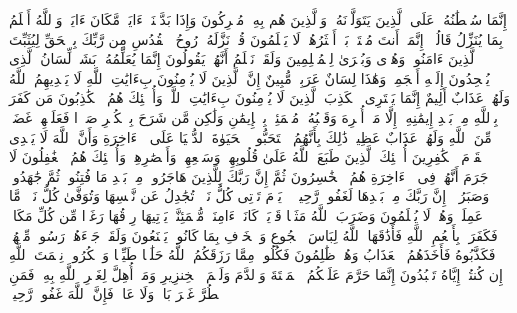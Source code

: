 \startbuffer[\q:16:100]
إِنَّمَا سُلۡطَٰنُهُۥ عَلَى ٱلَّذِینَ یَتَوَلَّوۡنَهُۥ وَٱلَّذِینَ هُم بِهِۦ مُشۡرِكُونَ%
\stopbuffer%
\startbuffer[\q:16:101]
وَإِذَا بَدَّلۡنَاۤ ءَایَةࣰ مَّكَانَ ءَایَةࣲ وَٱللَّهُ أَعۡلَمُ بِمَا یُنَزِّلُ قَالُوۤا۟ إِنَّمَاۤ أَنتَ مُفۡتَرِۭۚ بَلۡ أَكۡثَرُهُمۡ لَا یَعۡلَمُونَ%
\stopbuffer%
\startbuffer[\q:16:102]
قُلۡ نَزَّلَهُۥ رُوحُ ٱلۡقُدُسِ مِن رَّبِّكَ بِٱلۡحَقِّ لِیُثَبِّتَ ٱلَّذِینَ ءَامَنُوا۟ وَهُدࣰى وَبُشۡرَىٰ لِلۡمُسۡلِمِینَ%
\stopbuffer%
\startbuffer[\q:16:103]
وَلَقَدۡ نَعۡلَمُ أَنَّهُمۡ یَقُولُونَ إِنَّمَا یُعَلِّمُهُۥ بَشَرࣱۗ لِّسَانُ ٱلَّذِی یُلۡحِدُونَ إِلَیۡهِ أَعۡجَمِیࣱّ وَهَٰذَا لِسَانٌ عَرَبِیࣱّ مُّبِینٌ%
\stopbuffer%
\startbuffer[\q:16:104]
إِنَّ ٱلَّذِینَ لَا یُؤۡمِنُونَ بِءَایَٰتِ ٱللَّهِ لَا یَهۡدِیهِمُ ٱللَّهُ وَلَهُمۡ عَذَابٌ أَلِیمٌ%
\stopbuffer%
\startbuffer[\q:16:105]
إِنَّمَا یَفۡتَرِی ٱلۡكَذِبَ ٱلَّذِینَ لَا یُؤۡمِنُونَ بِءَایَٰتِ ٱللَّهِۖ وَأُو۟لَٰۤئِكَ هُمُ ٱلۡكَٰذِبُونَ%
\stopbuffer%
\startbuffer[\q:16:106]
مَن كَفَرَ بِٱللَّهِ مِنۢ بَعۡدِ إِیمَٰنِهِۦۤ إِلَّا مَنۡ أُكۡرِهَ وَقَلۡبُهُۥ مُطۡمَئِنُّۢ بِٱلۡإِیمَٰنِ وَلَٰكِن مَّن شَرَحَ بِٱلۡكُفۡرِ صَدۡرࣰا فَعَلَیۡهِمۡ غَضَبࣱ مِّنَ ٱللَّهِ وَلَهُمۡ عَذَابٌ عَظِیمࣱ%
\stopbuffer%
\startbuffer[\q:16:107]
ذَٰلِكَ بِأَنَّهُمُ ٱسۡتَحَبُّوا۟ ٱلۡحَیَوٰةَ ٱلدُّنۡیَا عَلَى ٱلۡءَاخِرَةِ وَأَنَّ ٱللَّهَ لَا یَهۡدِی ٱلۡقَوۡمَ ٱلۡكَٰفِرِینَ%
\stopbuffer%
\startbuffer[\q:16:108]
أُو۟لَٰۤئِكَ ٱلَّذِینَ طَبَعَ ٱللَّهُ عَلَىٰ قُلُوبِهِمۡ وَسَمۡعِهِمۡ وَأَبۡصَٰرِهِمۡۖ وَأُو۟لَٰۤئِكَ هُمُ ٱلۡغَٰفِلُونَ%
\stopbuffer%
\startbuffer[\q:16:109]
لَا جَرَمَ أَنَّهُمۡ فِی ٱلۡءَاخِرَةِ هُمُ ٱلۡخَٰسِرُونَ%
\stopbuffer%
\startbuffer[\q:16:110]
ثُمَّ إِنَّ رَبَّكَ لِلَّذِینَ هَاجَرُوا۟ مِنۢ بَعۡدِ مَا فُتِنُوا۟ ثُمَّ جَٰهَدُوا۟ وَصَبَرُوۤا۟ إِنَّ رَبَّكَ مِنۢ بَعۡدِهَا لَغَفُورࣱ رَّحِیمࣱ%
\stopbuffer%
\startbuffer[\q:16:111]
۞ یَوۡمَ تَأۡتِی كُلُّ نَفۡسࣲ تُجَٰدِلُ عَن نَّفۡسِهَا وَتُوَفَّىٰ كُلُّ نَفۡسࣲ مَّا عَمِلَتۡ وَهُمۡ لَا یُظۡلَمُونَ%
\stopbuffer%
\startbuffer[\q:16:112]
وَضَرَبَ ٱللَّهُ مَثَلࣰا قَرۡیَةࣰ كَانَتۡ ءَامِنَةࣰ مُّطۡمَئِنَّةࣰ یَأۡتِیهَا رِزۡقُهَا رَغَدࣰا مِّن كُلِّ مَكَانࣲ فَكَفَرَتۡ بِأَنۡعُمِ ٱللَّهِ فَأَذَٰقَهَا ٱللَّهُ لِبَاسَ ٱلۡجُوعِ وَٱلۡخَوۡفِ بِمَا كَانُوا۟ یَصۡنَعُونَ%
\stopbuffer%
\startbuffer[\q:16:113]
وَلَقَدۡ جَاۤءَهُمۡ رَسُولࣱ مِّنۡهُمۡ فَكَذَّبُوهُ فَأَخَذَهُمُ ٱلۡعَذَابُ وَهُمۡ ظَٰلِمُونَ%
\stopbuffer%
\startbuffer[\q:16:114]
فَكُلُوا۟ مِمَّا رَزَقَكُمُ ٱللَّهُ حَلَٰلࣰا طَیِّبࣰا وَٱشۡكُرُوا۟ نِعۡمَتَ ٱللَّهِ إِن كُنتُمۡ إِیَّاهُ تَعۡبُدُونَ%
\stopbuffer%
\startbuffer[\q:16:115]
إِنَّمَا حَرَّمَ عَلَیۡكُمُ ٱلۡمَیۡتَةَ وَٱلدَّمَ وَلَحۡمَ ٱلۡخِنزِیرِ وَمَاۤ أُهِلَّ لِغَیۡرِ ٱللَّهِ بِهِۦۖ فَمَنِ ٱضۡطُرَّ غَیۡرَ بَاغࣲ وَلَا عَادࣲ فَإِنَّ ٱللَّهَ غَفُورࣱ رَّحِیمࣱ%
